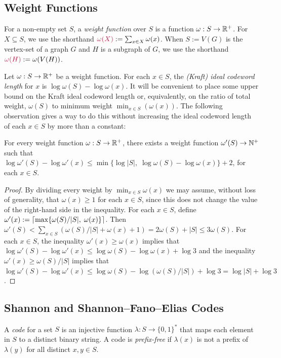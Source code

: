 \documentclass{patmorin}
\makeatletter
\renewcommand{\ge}{\geqslant}
\renewcommand{\le}{\leqslant}
\newcommand{\defin}[1]{\emph{\textcolor{brightmaroon}{#1}}}
\def\mathcolor#1#{\@mathcolor{#1}}
\def\@mathcolor#1#2#3{%
  \protect\leavevmode
  \begingroup
    \color#1{#2}#3%
  \endgroup
}
\newcommand{\mathdefin}[1]{\mathcolor{brightmaroon}{#1}}
\DeclarePairedDelimiter{\ceil}{\lceil}{\rceil}
\makeatother
\begin{document}
\subsection{Weight Functions}

For a non-empty set $S$, a \defin{weight function} over $S$ is a function $\omega:S\to\mathbb{R}^+$. For $X\subseteq S$, we use the shorthand $\mathdefin{\omega(X)}:=\sum_{x\in X}\omega(x)$.  When $S:=V(G)$ is the vertex-set of a graph $G$ and $H$ is a subgraph of $G$, we use the shorthand $\mathdefin{\omega(H)}:=\omega(V(H))$.

Let $\omega:S\to\mathbb{R}^+$ be a weight function.  For each $x\in S$, the \defin{(Kraft) ideal codeword length} for $x$ is $\log\omega(S)-\log\omega(x)$.
It will be convenient to place some upper bound on the Kraft ideal codeword length or, equivalently, on the ratio of total weight, $\omega(S)$ to minimum weight $\min_{x\in S}(\omega(x))$.  The following observation gives a way to do this without increasing the ideal codeword length of each $x\in S$ by more than a constant:

\begin{obs}\label{obs:nice}
  For every weight function $\omega:S\to\mathbb{R}^+$, there exists a weight function $\omega'(S)\to\mathbb{N}^+$ such that $\log\omega'(S)-\log\omega'(x)\le\min\{\log|S|,\;\log\omega(S)-\log\omega(x)\}+2$, for each $x\in S$.
\end{obs}

\begin{proof}
  By dividing every weight by $\min_{x\in S}\omega(x)$ we may assume, without loss of generality, that $\omega(x)\ge 1$ for each $x\in S$, since this does not change the value of the right-hand side in the inequality.
  For each $x\in S$, define $\omega'(x):=\ceil{\max\{\omega(S)/|S|,\; \omega(x)\}}$.  Then $\omega'(S)<\sum_{x\in S}(\omega(S)/|S|+\omega(x)+1)= 2\omega(S)+|S|\le 3\omega(S)$.  For each $x\in S$, the inequality $\omega'(x)\ge \omega(x)$ implies that $\log\omega'(S)-\log\omega'(x)\le\log \omega(S)-\log\omega(x)+\log 3$ and the inequality $\omega'(x)\ge \omega(S)/|S|$ implies that $\log\omega'(S)-\log\omega'(x)\le \log\omega(S)-\log(\omega(S)/|S|) + \log 3 = \log|S| + \log 3$.
\end{proof}

\subsection{Shannon and Shannon--Fano--Elias Codes}

A \defin{code} for a set $S$ is an injective function $\lambda:S\to\{0,1\}^*$ that maps each element in $S$ to a distinct binary string.  A code is \defin{prefix-free} if $\lambda(x)$ is not a prefix of $\lambda(y)$ for all distinct $x,y\in S$.
\end{document}
